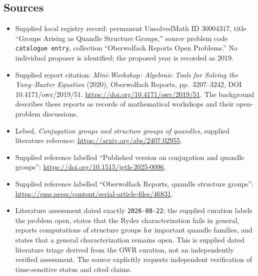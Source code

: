 \documentclass[11pt]{article}
\begin{document}
\subsection{Sources}
\begin{itemize}
\item Supplied local registry record: permanent UnsolvedMath ID \(30004317\), title ``Groups Arising as Quandle Structure Groups,'' source problem code \texttt{catalogue entry}, collection ``Oberwolfach Reports Open Problems.'' No individual proposer is identified; the proposed year is recorded as 2019.
\item Supplied report citation: \emph{Mini-Workshop: Algebraic Tools for Solving the Yang--Baxter Equation} (2020), Oberwolfach Reports, pp.~3207--3242, DOI 10.4171/owr/2019/51. \url{https://doi.org/10.4171/owr/2019/51}. The background describes these reports as records of mathematical workshops and their open-problem discussions.
\item Lebed, \emph{Conjugation groups and structure groups of quandles}, supplied literature reference: \url{https://arxiv.org/abs/2407.02955}.
\item Supplied reference labelled ``Published version on conjugation and quandle groups'': \url{https://doi.org/10.1515/jgth-2025-0096}.
\item Supplied reference labelled ``Oberwolfach Reports, quandle structure groups'': \url{https://ems.press/content/serial-article-files/46831}.
\item Literature assessment dated exactly \texttt{2026-08-22}: the supplied curation labels the problem open, states that the Ryder characterization fails in general, reports computations of structure groups for important quandle families, and states that a general characterization remains open. This is supplied dated literature triage derived from the OWR curation, not an independently verified assessment. The source explicitly requests independent verification of time-sensitive status and cited claims.
\end{itemize}
\end{document}
